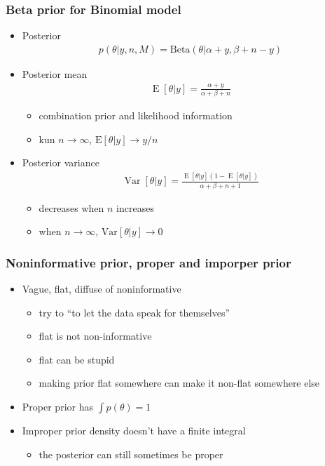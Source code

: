 \documentclass[english,t]{beamer}
\DeclareMathOperator{\E}{E}
\DeclareMathOperator{\Var}{Var}
\begin{document}
\begin{frame}
  \frametitle{Beta prior for Binomial model}

  \begin{itemize}
  \item Posterior
    \baselineskip
    \begin{align*}
      p(\theta|y,n,M) = \text{Beta}(\theta|\alpha+y,\beta+n-y)
    \end{align*}
  \item Posterior mean
    \baselineskip
    \begin{align*}
      \E[\theta|y] = \frac{\alpha+y}{\alpha+\beta+n}
    \end{align*}
    \begin{itemize}
    \item combination prior and likelihood information
    \item kun $n\rightarrow\infty$, $\text{E}[\theta|y]\rightarrow y/n$
    \end{itemize}
    \pause
  \item  Posterior variance
    \baselineskip
    \begin{align*}
      \Var[\theta|y]=\frac{\E[\theta|y](1-\E[\theta|y])}{\alpha+\beta+n+1}
    \end{align*}
    \begin{itemize}
    \item decreases when $n$ increases
    \item when $n\rightarrow\infty$, $\text{Var}[\theta|y]\rightarrow 0$
    \end{itemize}      
  \end{itemize}

\end{frame}

\begin{frame}

  \frametitle{Noninformative prior, proper and imporper prior}

  \begin{itemize}
  \item Vague, flat, diffuse of noninformative
    \begin{itemize}
    \item try to ``to let the data speak for themselves''
    \item flat is not non-informative
    \item flat can be stupid
    \item making prior flat somewhere can make it non-flat somewhere
      else
    \end{itemize}
  \item Proper prior has $\int p(\theta) = 1$
  \item Improper prior density doesn't have a finite integral
    \begin{itemize}
    \item the posterior can still sometimes be proper
    \end{itemize}
  \end{itemize}
  
\end{frame}
\end{document}
